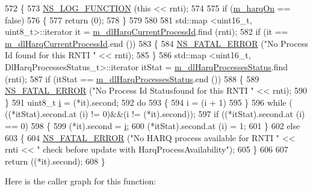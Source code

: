 \begin{DoxyCode}
572 \{
573   \hyperlink{log-macros-disabled_8h_a90b90d5bad1f39cb1b64923ea94c0761}{NS\_LOG\_FUNCTION} (\textcolor{keyword}{this} << rnti);
574 
575   \textcolor{keywordflow}{if} (\hyperlink{classns3_1_1FdBetFfMacScheduler_a37792b61da166e932f6697569d19a479}{m\_harqOn} == \textcolor{keyword}{false})
576     \{
577       \textcolor{keywordflow}{return} (0);
578     \}
579 
580 
581   std::map <uint16\_t, uint8\_t>::iterator it = \hyperlink{classns3_1_1FdBetFfMacScheduler_a7c1cfb93fd3fa63e6811486c023934c2}{m\_dlHarqCurrentProcessId}.find (rnti);
582   \textcolor{keywordflow}{if} (it == \hyperlink{classns3_1_1FdBetFfMacScheduler_a7c1cfb93fd3fa63e6811486c023934c2}{m\_dlHarqCurrentProcessId}.end ())
583     \{
584       \hyperlink{group__fatal_ga5131d5e3f75d7d4cbfd706ac456fdc85}{NS\_FATAL\_ERROR} (\textcolor{stringliteral}{"No Process Id found for this RNTI "} << rnti);
585     \}
586   std::map <uint16\_t, DlHarqProcessesStatus\_t>::iterator itStat = 
      \hyperlink{classns3_1_1FdBetFfMacScheduler_a93d8bf3298e9b289d9fcf70571b27b78}{m\_dlHarqProcessesStatus}.find (rnti);
587   \textcolor{keywordflow}{if} (itStat == \hyperlink{classns3_1_1FdBetFfMacScheduler_a93d8bf3298e9b289d9fcf70571b27b78}{m\_dlHarqProcessesStatus}.end ())
588     \{
589       \hyperlink{group__fatal_ga5131d5e3f75d7d4cbfd706ac456fdc85}{NS\_FATAL\_ERROR} (\textcolor{stringliteral}{"No Process Id Statusfound for this RNTI "} << rnti);
590     \}
591   uint8\_t \hyperlink{bernuolliDistribution_8m_a6f6ccfcf58b31cb6412107d9d5281426}{i} = (*it).second;
592   \textcolor{keywordflow}{do}
593     \{
594       i = (i + 1) %
595     \}
596   \textcolor{keywordflow}{while} ( ((*itStat).second.at (i) != 0)&&(i != (*it).second));
597   \textcolor{keywordflow}{if} ((*itStat).second.at (i) == 0)
598     \{
599       (*it).second = \hyperlink{bernuolliDistribution_8m_a6f6ccfcf58b31cb6412107d9d5281426}{i};
600       (*itStat).second.at (i) = 1;
601     \}
602   \textcolor{keywordflow}{else}
603     \{
604       \hyperlink{group__fatal_ga5131d5e3f75d7d4cbfd706ac456fdc85}{NS\_FATAL\_ERROR} (\textcolor{stringliteral}{"No HARQ process available for RNTI "} << rnti << \textcolor{stringliteral}{" check before update
       with HarqProcessAvailability"});
605     \}
606 
607   \textcolor{keywordflow}{return} ((*it).second);
608 \}
\end{DoxyCode}


Here is the caller graph for this function\+:


